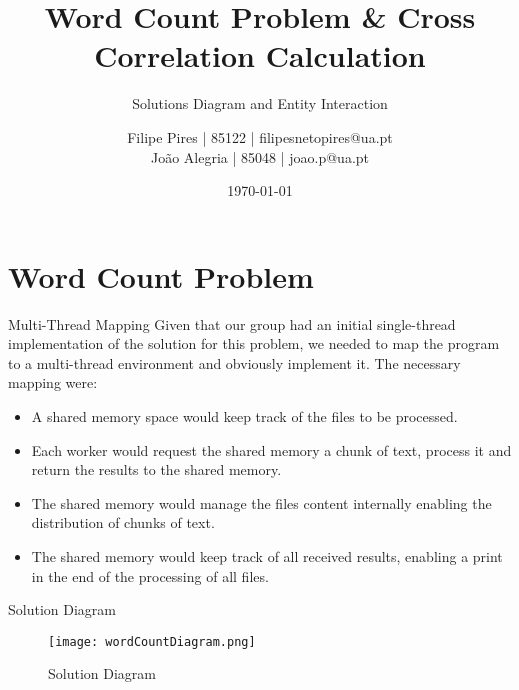 \documentclass{beamer}
\title{Word Count Problem \& Cross Correlation Calculation}
\subtitle{Solutions Diagram and Entity Interaction}
\author{Filipe Pires | 85122 | filipesnetopires@ua.pt \\ João Alegria | 85048 | joao.p@ua.pt}
\institute{University of Aveiro, DETI}
\date{\today}
\begin{document}

\begin{frame}
	\maketitle %
\end{frame}


\section{Word Count Problem}


\begin{frame}{Multi-Thread Mapping}
	Given that our group had an initial single-thread implementation of the solution for this problem, we needed to map the program to a multi-thread environment and obviously implement it. The necessary mapping were:
	\begin{itemize}
		\item A shared memory space would keep track of the files to be processed.
		\item Each worker would request the shared memory a chunk of text, process it and return the results to the shared memory.
		\item The shared memory would manage the files content internally enabling the distribution of chunks of text.
		\item The shared memory would keep track of all received results, enabling a print in the end of the processing of all files.
	\end{itemize}
\end{frame}


\begin{frame}{Solution Diagram}
	\begin{figure}
		\texttt{[image: wordCountDiagram.png]}
		\caption{Solution Diagram}
		\label{wordDiagram}
	\end{figure}
\end{frame}
\end{document}
